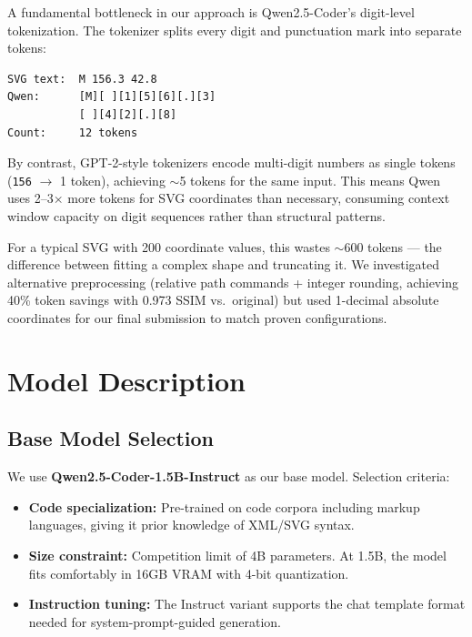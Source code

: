 \documentclass[11pt]{article}
\begin{document}
A fundamental bottleneck in our approach is Qwen2.5-Coder's digit-level tokenization. The tokenizer splits every digit and punctuation mark into separate tokens:

{\small
\begin{verbatim}
SVG text:  M 156.3 42.8
Qwen:      [M][ ][1][5][6][.][3]
           [ ][4][2][.][8]
Count:     12 tokens
\end{verbatim}
}

By contrast, GPT-2-style tokenizers encode multi-digit numbers as single tokens (\texttt{156} $\rightarrow$ 1 token), achieving $\sim$5 tokens for the same input. This means Qwen uses 2--3$\times$ more tokens for SVG coordinates than necessary, consuming context window capacity on digit sequences rather than structural patterns.

For a typical SVG with 200 coordinate values, this wastes $\sim$600 tokens --- the difference between fitting a complex shape and truncating it. We investigated alternative preprocessing (relative path commands + integer rounding, achieving 40\% token savings with 0.973 SSIM vs.\ original) but used 1-decimal absolute coordinates for our final submission to match proven configurations.

\section{Model Description}

\subsection{Base Model Selection}

We use \textbf{Qwen2.5-Coder-1.5B-Instruct} \citep{qwen2024} as our base model. Selection criteria:
\begin{itemize}
    \item \textbf{Code specialization:} Pre-trained on code corpora including markup languages, giving it prior knowledge of XML/SVG syntax.
    \item \textbf{Size constraint:} Competition limit of 4B parameters. At 1.5B, the model fits comfortably in 16GB VRAM with 4-bit quantization.
    \item \textbf{Instruction tuning:} The Instruct variant supports the chat template format needed for system-prompt-guided generation.
\end{itemize}
\end{document}
